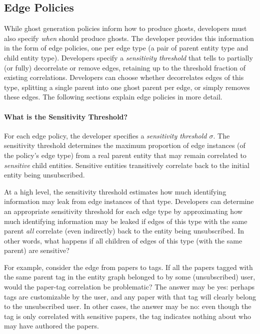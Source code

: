 \subsection{Edge Policies}
While ghost generation policies inform \sys how to produce ghosts, developers must also specify
\emph{when} \sys should produce ghosts. 
The developer provides \sys this information in the form of edge policies, one per edge type (a pair of parent
entity type and child entity type). 
Developers specify a
\emph{sensitivity threshold} that tells \sys to partially (or fully) decorrelate or remove edges,
retaining up to the threshold fraction of existing correlations.
Developers can choose whether \sys decorrelates edges of this type, splitting a single parent
into one ghost parent per edge, or simply removes these edges. 
The following sections explain edge policies in more detail.

\paragraph{What is the Sensitivity Threshold?}
For each edge policy, the developer specifies a \emph{sensitivity
threshold $\sigma$}. 
%
The sensitivity threshold determines the maximum proportion of edge instances (of the policy's edge
type) from a real parent entity that may remain correlated to \emph{sensitive} child entities.
Sensitive entities transitively correlate back to the initial entity being unsubscribed. 

At a high level, the sensitivity threshold estimates how much identifying information may leak from
edge instances of that type. Developers can determine an appropriate sensitivity threshold for each
edge type by approximating how much identifying information may be leaked if edges of this type with
the same parent \emph{all} correlate (even indirectly) back to the entity being unsubscribed. In
other words, what happens if all children of edges of this type (with the same parent) are
sensitive?

For example, consider the edge from papers to tags. If all the papers tagged with the same parent
tag in the entity graph belonged to by some (unsubscribed) user, would the paper-tag correlation be
problematic? The answer may be yes: perhaps tags are customizable by the user, and any paper with
that tag will clearly belong to the unsubscribed user. In other cases, the answer may be no: even
though the tag is only correlated with sensitive papers, the tag indicates nothing about who may
have authored the papers.

